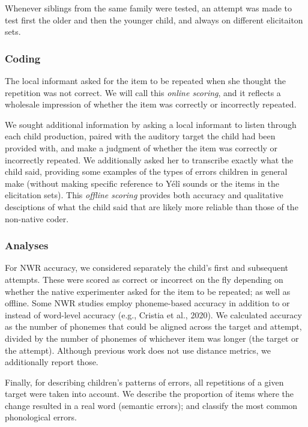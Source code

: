 \documentclass[english,,man]{apa6}
\begin{document}
Whenever siblings from the same family were tested, an attempt was made to test first the older and then the younger child, and always on different elicitaiton sets.

\hypertarget{coding}{%
\subsubsection{Coding}\label{coding}}

The local informant asked for the item to be repeated when she thought the repetition was not correct. We will call this \emph{online scoring}, and it reflects a wholesale impression of whether the item was correctly or incorrectly repeated.

We sought additional information by asking a local informant to listen through each child production, paired with the auditory target the child had been provided with, and make a judgment of whether the item was correctly or incorrectly repeated. We additionally asked her to transcribe exactly what the child said, providing some examples of the types of errors children in general make (without making specific reference to Yélî sounds or the items in the elicitation sets). This \emph{offline scoring} provides both accuracy and qualitative desciptions of what the child said that are likely more reliable than those of the non-native coder.

\hypertarget{analyses}{%
\subsubsection{Analyses}\label{analyses}}

For NWR accuracy, we considered separately the child's first and subsequent attempts. These were scored as correct or incorrect on the fly depending on whether the native experimenter asked for the item to be repeated; as well as offline. Some NWR studies employ phoneme-based accuracy in addition to or instead of word-level accuracy (e.g., Cristia et al., 2020). We calculated accuracy as the number of phonemes that could be aligned across the target and attempt, divided by the number of phonemes of whichever item was longer (the target or the attempt). Although previous work does not use distance metrics, we additionally report those.

Finally, for describing children's patterns of errors, all repetitions of a given target were taken into account. We describe the proportion of items where the change resulted in a real word (semantic errors); and classify the most common phonological errors.
\end{document}
